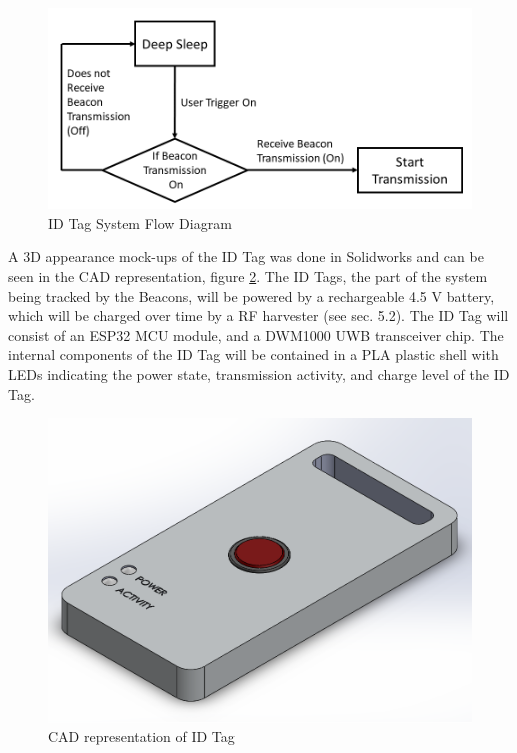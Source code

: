 \bigskip
\begin{figure}[H]
\centering
    \includegraphics[width=\linewidth]{./images/id_flow.png}
    \caption{ID Tag System Flow Diagram}
    \label{id_flow}
\end{figure}

\pagebreak
A 3D appearance mock-ups of the ID Tag was done in Solidworks and can be seen in the CAD representation, figure \ref{ID_Tag}. The ID Tags, the part of the system being tracked by the Beacons, will be powered by a rechargeable 4.5 V battery, which will be charged over time by a RF harvester (see sec. 5.2). The ID Tag will consist of an ESP32 MCU module, and a DWM1000 UWB transceiver chip. The internal components of the ID Tag will be contained in a PLA plastic shell with LEDs indicating the power state, transmission activity, and charge level of the ID Tag. 

\bigskip
\begin{figure}[H]
\centering
    \includegraphics[width=\linewidth]{./images/ID_Tag.png}
    \caption{CAD representation of ID Tag}
    \label{ID_Tag}
\end{figure}



